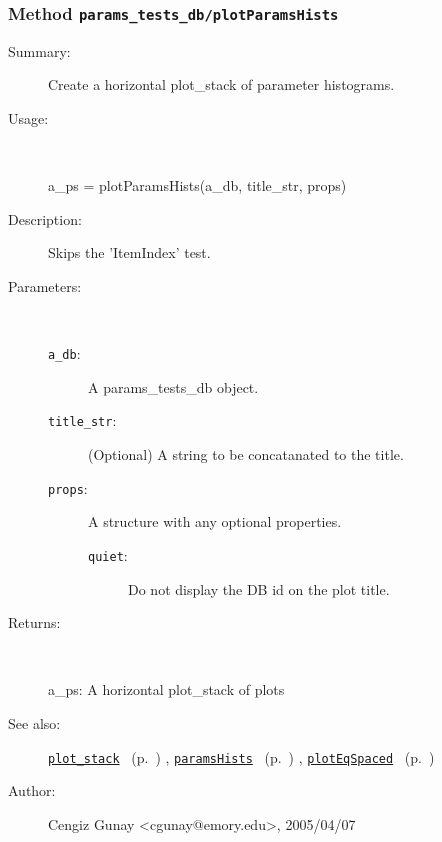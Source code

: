 \subsubsection[Method \texttt{plotParamsHists}]{Method \texttt{params\_tests\_db/plotParamsHists}}%
%
\label{ref_params_tests_db__plotParamsHists}%
\hypertarget{ref_params_tests_db__plotParamsHists}{}%
\begin{description}
\item[Summary:]Create a horizontal plot\_stack of parameter histograms.
%
\item[Usage:]~%
\begin{lyxcode}%
a\_ps = plotParamsHists(a\_db, title\_str, props)
%
\end{lyxcode}%
%
\item[Description:]%
Skips the 'ItemIndex' test.
\item[Parameters:]~
\begin{description}%
\item[\texttt{a\_db}:]
 A params\_tests\_db object.
\item[\texttt{title\_str}:]
 (Optional) A string to be concatanated to the title.
\item[\texttt{props}:]
 A structure with any optional properties.
\begin{description}%
\item[\texttt{quiet}:]
 Do not display the DB id on the plot title.
\end{description}%
\end{description}%
%
\item[Returns:]~

	a\_ps: A horizontal plot\_stack of plots
%
%
\item[See also:]%
\hyperlink{ref_plot_stack}{\texttt{plot\_stack}}%
\ (p.~\pageref{ref_plot_stack})%
%
, \hyperlink{ref_paramsHists}{\texttt{paramsHists}}%
\ (p.~\pageref{ref_paramsHists})%
%
, \hyperlink{ref_plotEqSpaced}{\texttt{plotEqSpaced}}%
\ (p.~\pageref{ref_plotEqSpaced})%
%
%
\item[Author:]%
Cengiz Gunay <cgunay@emory.edu>, 2005/04/07%
\end{description}
\methodline%

